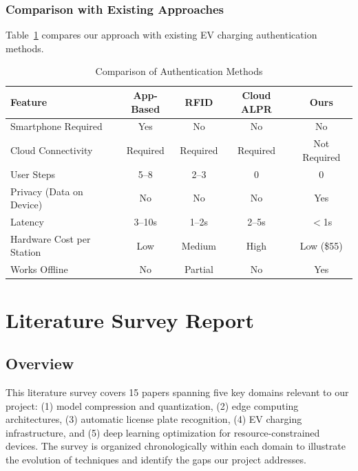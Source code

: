 \documentclass[11pt]{report}
\begin{document}
\subsection{Comparison with Existing Approaches}
Table~\ref{tab:comparison} compares our approach with existing EV charging authentication methods.

\begin{table}[H]
\centering
\caption{Comparison of Authentication Methods}
\label{tab:comparison}
\renewcommand{\arraystretch}{1.3}
\footnotesize
\begin{tabular}{|l|c|c|c|c|}
\hline
\textbf{Feature} & \textbf{App-Based} & \textbf{RFID} & \textbf{Cloud ALPR} & \textbf{Ours} \\
\hline
Smartphone Required & Yes & No & No & No \\
\hline
Cloud Connectivity & Required & Required & Required & Not Required \\
\hline
User Steps & 5--8 & 2--3 & 0 & 0 \\
\hline
Privacy (Data on Device) & No & No & No & Yes \\
\hline
Latency & 3--10s & 1--2s & 2--5s & $<$1s \\
\hline
Hardware Cost per Station & Low & Medium & High & Low (\$55) \\
\hline
Works Offline & No & Partial & No & Yes \\
\hline
\end{tabular}
\end{table}

\chapter{Literature Survey Report}

\section{Overview}
This literature survey covers 15 papers spanning five key domains relevant to our project: (1) model compression and quantization, (2) edge computing architectures, (3) automatic license plate recognition, (4) EV charging infrastructure, and (5) deep learning optimization for resource-constrained devices. The survey is organized chronologically within each domain to illustrate the evolution of techniques and identify the gaps our project addresses.
\end{document}
